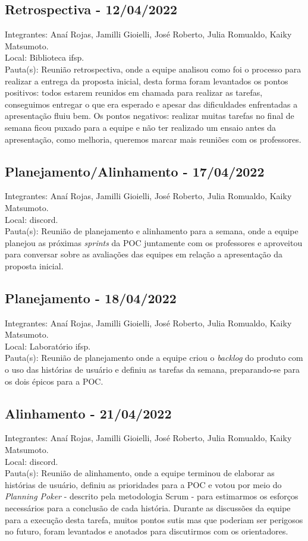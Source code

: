 \subsection{Retrospectiva - 12/04/2022}
\noindent Integrantes: Anaí Rojas, Jamilli Gioielli, José Roberto, Julia Romualdo, Kaiky Matsumoto. \\
Local: Biblioteca \acs{ifsp}.\\
Pauta(s): Reunião retrospectiva, onde a equipe analisou como foi o processo para realizar a entrega da proposta inicial, desta forma foram levantados os pontos positivos: todos estarem reunidos em chamada para realizar as tarefas, conseguimos entregar o que era esperado e apesar das dificuldades enfrentadas a apresentação fluiu bem. Os pontos negativos: realizar muitas tarefas no final de semana ficou puxado para a equipe e não ter realizado um ensaio antes da apresentação, como melhoria, queremos marcar mais reuniões com os professores.

\subsection{Planejamento/Alinhamento - 17/04/2022}
\noindent Integrantes: Anaí Rojas, Jamilli Gioielli, José Roberto, Julia Romualdo, Kaiky Matsumoto. \\
Local: \gls{discord}.\\
Pauta(s): Reunião de planejamento e alinhamento para a semana, onde a equipe planejou as próximas \textsl{sprints} da \acs{POC} juntamente com os professores e aproveitou para conversar sobre as avaliações das equipes em relação a apresentação da proposta inicial. 

\subsection{Planejamento - 18/04/2022}
\noindent Integrantes: Anaí Rojas, Jamilli Gioielli, José Roberto, Julia Romualdo, Kaiky Matsumoto. \\
Local: Laboratório \acs{ifsp}.\\
Pauta(s): Reunião de planejamento onde a equipe criou o \textsl{backlog} do produto com o uso das histórias de usuário e definiu as tarefas da semana, preparando-se para os dois épicos para a \acs{POC}.

\subsection{Alinhamento - 21/04/2022}
\noindent Integrantes: Anaí Rojas, Jamilli Gioielli, José Roberto, Julia Romualdo, Kaiky Matsumoto. \\
Local: \gls{discord}.\\
Pauta(s): Reunião de alinhamento, onde a equipe terminou de elaborar as histórias de usuário, definiu as prioridades para a \acs{POC} e votou por meio do \textsl{Planning Poker} - descrito pela metodologia Scrum - para estimarmos os esforços necessários para a conclusão de cada história. Durante as discussões da equipe para a execução desta tarefa, muitos pontos sutis mas que poderiam ser perigosos no futuro, foram levantados e anotados para discutirmos com os orientadores. 

